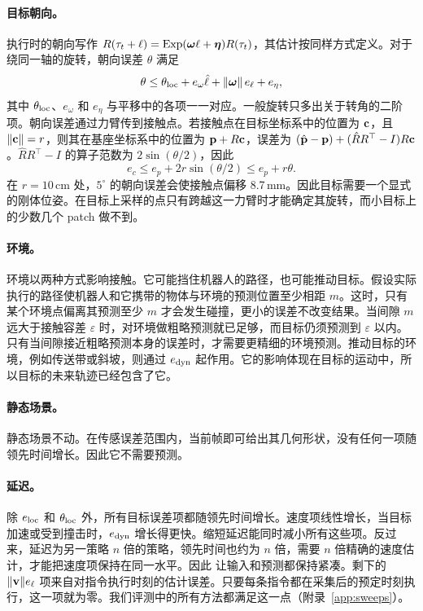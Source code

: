 \paragraph{目标朝向。}
执行时的朝向写作 $R(\tau_t+\ell)=\operatorname{Exp}(\boldsymbol\omega\ell+\boldsymbol\eta)R(\tau_t)$，其估计按同样方式定义。对于绕同一轴的旋转，朝向误差 $\theta$ 满足
\begin{equation}
\theta\le\theta_{\rm loc}+e_\omega\hat\ell+\|\boldsymbol\omega\|\,e_\ell+e_\eta,
\label{eq:budget_rotation}
\end{equation}
其中 $\theta_{\rm loc}$、$e_\omega$ 和 $e_\eta$ 与平移中的各项一一对应。一般旋转只多出关于转角的二阶项。朝向误差通过力臂传到接触点。若接触点在目标坐标系中的位置为 $\mathbf{c}$，且 $\|\mathbf{c}\|=r$，则其在基座坐标系中的位置为 $\mathbf{p}+R\mathbf{c}$，误差为 $(\hat{\mathbf{p}}-\mathbf{p})+(\hat RR^\top-I)R\mathbf{c}$。$\hat RR^\top-I$ 的算子范数为 $2\sin(\theta/2)$，因此
\begin{equation}
e_c\le e_p+2r\sin(\theta/2)\le e_p+r\theta .
\label{eq:budget_contact}
\end{equation}
在 $r=10$\,cm 处，$5^\circ$ 的朝向误差会使接触点偏移 8.7\,mm。因此目标需要一个显式的刚体位姿。在目标上采样的点只有跨越这一力臂时才能确定其旋转，而小目标上的少数几个 patch 做不到。

\paragraph{环境。}
环境以两种方式影响接触。它可能挡住机器人的路径，也可能推动目标。假设实际执行的路径使机器人和它携带的物体与环境的预测位置至少相距 $m$。这时，只有某个环境点偏离其预测至少 $m$ 才会发生碰撞，更小的误差不改变结果。当间隙 $m$ 远大于接触容差 $\varepsilon$ 时，对环境做粗略预测就已足够，而目标仍须预测到 $\varepsilon$ 以内。只有当间隙接近粗略预测本身的误差时，才需要更精细的环境预测。推动目标的环境，例如传送带或斜坡，则通过 $e_{\rm dyn}$ 起作用。它的影响体现在目标的运动中，所以目标的未来轨迹已经包含了它。

\paragraph{静态场景。}
静态场景不动。在传感误差范围内，当前帧即可给出其几何形状，没有任何一项随领先时间增长。因此它不需要预测。

\paragraph{延迟。}
除 $e_{\rm loc}$ 和 $\theta_{\rm loc}$ 外，所有目标误差项都随领先时间增长。速度项线性增长，当目标加速或受到撞击时，$e_{\rm dyn}$ 增长得更快。缩短延迟能同时减小所有这些项。反过来，延迟为另一策略 $n$ 倍的策略，领先时间也约为 $n$ 倍，需要 $n$ 倍精确的速度估计，才能把速度项保持在同一水平。因此 \ours 让输入和预测都保持紧凑。剩下的 $\|\mathbf{v}\|e_\ell$ 项来自对指令执行时刻的估计误差。只要每条指令都在采集后的预定时刻执行，这一项就为零。我们评测中的所有方法都满足这一点（附录~\ref{app:sweeps}）。

